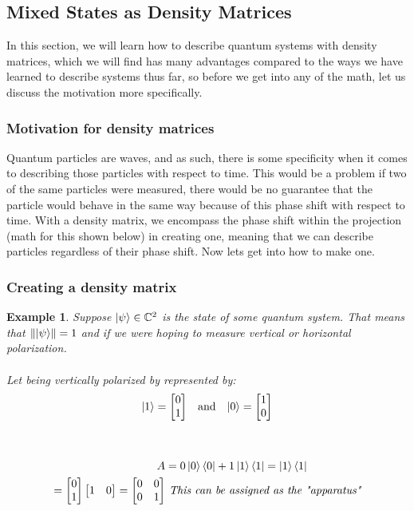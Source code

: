 \documentclass[12pt]{article}
\theoremstyle{plain}
\theoremstyle{nonumberplain}
\theoremstyle{plain}
\newtheorem{example}[lemma]{Example}
\theoremstyle{nonumberplain}
\newcommand\1{{\bf 1}}
\newcommand{\bmat}[1]{\begin{bmatrix*} #1 \end{bmatrix*}} %
\newcommand{\C}{\mathbb{C}} %
\newcommand{\<}{\left\langle}
\renewcommand{\>}{\right\rangle}
\newcommand{\norm}[1]{\left\lVert#1\right\rVert} %
\begin{document}
\pagebreak

\subsection{Mixed States as Density Matrices}
In this section, we will learn how to describe quantum systems with density matrices, which we will find has many advantages compared to the ways we have learned to describe systems thus far, so before we get into any of the math, let us discuss the motivation more specifically.

\subsubsection{Motivation for density matrices}
Quantum particles are waves, and as such, there is some specificity when it comes to describing those particles with respect to time.  This would be a problem if two of the same particles were measured, there would be no guarantee that the particle would behave in the same way because of this phase shift with respect to time.  With a density matrix, we encompass the phase shift within the projection (math for this shown below) in creating one, meaning that we can describe particles regardless of their phase shift.  Now lets get into how to make one.


\subsubsection{Creating a density matrix}
\begin{example}
Suppose $\ket{\psi} \in \C^2$ is the state of some quantum system. That means that $\norm{\ket{\psi}} = 1$ and if we were hoping to measure vertical or horizontal polarization.  \\
\\
Let being vertically polarized by represented by: 
\begin{align*}
\ket{1} &= \bmat{0 \\1} & \text{a}&\text{nd} & \ket{0} &= \bmat{1 \\0}\\
\end{align*}
\begin{center}
\\
\end{center}

\begin{align*}
A &= 0\ket{0}\bra{0} + 1\ket{1}\bra{1} =  \ket{1}\bra{1}\\
= \bmat{0\\1}\bmat{1&0} = \bmat{0&0\\0&1} &\textit{ This can be assigned as the "apparatus"}
\end{align*}
\end{example}
\end{document}

